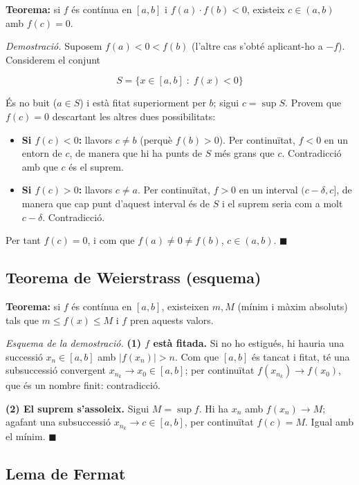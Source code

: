 \textbf{Teorema:} si $f$ és contínua en $[a,b]$ i $f(a)\cdot f(b)<0$, existeix $c\in(a,b)$ amb $f(c)=0$.

\emph{Demostració.} Suposem $f(a)<0<f(b)$ (l'altre cas s'obté aplicant-ho a $-f$). Considerem el conjunt

\begin{equation*}
S=\{x\in[a,b]\;:\;f(x)<0\}
\end{equation*}

És no buit ($a\in S$) i està fitat superiorment per $b$; sigui $c=\sup S$. Provem que $f(c)=0$ descartant les altres dues possibilitats:

\begin{itemize}
\item \textbf{Si $f(c)<0$:} llavors $c\neq b$ (perquè $f(b)>0$). Per continuïtat, $f<0$ en un entorn de $c$, de manera que hi ha punts de $S$ més grans que $c$. Contradicció amb que $c$ és el suprem.
\item \textbf{Si $f(c)>0$:} llavors $c\neq a$. Per continuïtat, $f>0$ en un interval $(c-\delta,c]$, de manera que cap punt d'aquest interval és de $S$ i el suprem seria com a molt $c-\delta$. Contradicció.
\end{itemize}

Per tant $f(c)=0$, i com que $f(a)\neq0\neq f(b)$, $c\in(a,b)$. $\blacksquare$

\subsection{Teorema de Weierstrass (esquema)}

\textbf{Teorema:} si $f$ és contínua en $[a,b]$, existeixen $m,M$ (mínim i màxim absoluts) tals que $m\le f(x)\le M$ i $f$ pren aquests valors.

\emph{Esquema de la demostració.} \textbf{(1) $f$ està fitada.} Si no ho estigués, hi hauria una successió $x_n\in[a,b]$ amb $|f(x_n)|>n$. Com que $[a,b]$ és tancat i fitat, té una subsuccessió convergent $x_{n_k}\to x_0\in[a,b]$; per continuïtat $f(x_{n_k})\to f(x_0)$, que és un nombre finit: contradicció.

\textbf{(2) El suprem s'assoleix.} Sigui $M=\sup f$. Hi ha $x_n$ amb $f(x_n)\to M$; agafant una subsuccessió $x_{n_k}\to c\in[a,b]$, per continuïtat $f(c)=M$. Igual amb el mínim. $\blacksquare$

\subsection{Lema de Fermat}

